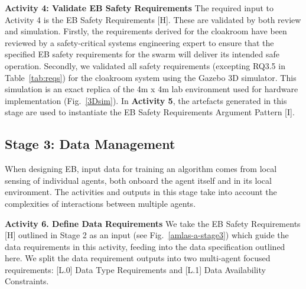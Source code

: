 \documentclass[runningheads]{llncs}
\begin{document}
%
\noindent\textbf{Activity 4: Validate EB Safety Requirements} The required input to Activity 4 is the EB Safety Requirements [H].  
These
are validated by both review and simulation.
Firstly, the requirements derived for the cloakroom have been reviewed by a safety-critical systems engineering expert to ensure that the specified EB safety requirements for the swarm will deliver its intended safe operation. Secondly, we validated all safety requirements (excepting RQ3.5 in Table~\ref{tab:reqs}) for the cloakroom system using the Gazebo 3D simulator. 
This simulation is an exact replica of the 4m x 4m lab environment used for hardware implementation (Fig.~\ref{3Dsim}). 
In \textbf{Activity 5}, the artefacts generated in this stage are used to instantiate the EB Safety Requirements Argument Pattern [I].  
\subsection{Stage 3: Data Management} \label{framework-stage3}
When designing EB, input data for training an algorithm comes from local sensing of individual agents, both onboard the agent itself and in its local environment. The activities and outputs in this stage take into account the complexities of interactions between multiple agents.

\noindent\textbf{Activity 6. Define Data Requirements} %
We take the EB Safety Requirements [H] outlined in Stage 2 as an input (see Fig.~\ref{amlas-a-stage3}) which guide the data requirements in this activity, feeding into the data specification outlined here. We split the data requirement outputs into two multi-agent focused requirements: [L.0] Data Type Requirements and [L.1] Data Availability Constraints.
\end{document}
